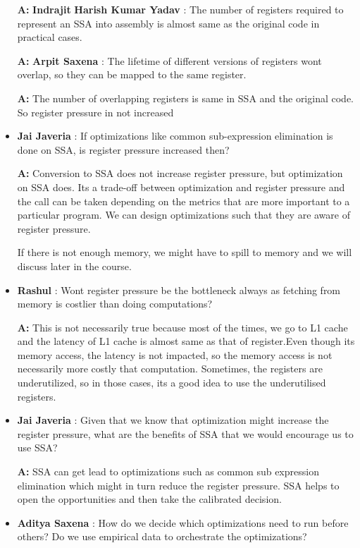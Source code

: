 \begin{itemize}
    \textbf{A:}  \textbf{Indrajit} \textbf{Harish Kumar Yadav} : The number of registers required to represent an SSA into assembly is almost same as the original code in practical cases.  
    
    \textbf{A:} \textbf{Arpit Saxena} : The lifetime of different versions of registers wont overlap, so they can be mapped to the same register.
    
    \textbf{A:} The number of overlapping registers is same in SSA and the original code. So register pressure in not increased
    
    \item \textbf{Jai Javeria} : If optimizations like common sub-expression elimination is done on SSA, is register pressure increased then?
    
    \textbf{A:} Conversion to SSA does not increase register pressure, but optimization on SSA does. Its a trade-off between optimization and register pressure and the call can be taken depending on the metrics that are more important to a particular program. We can design optimizations such that they are aware of register pressure.
    
    If there is not enough memory, we might have to spill to memory and we will discuss later in the course.
    
    \item \textbf{Rashul} : Wont register pressure be the bottleneck always as fetching from memory is costlier than doing computations?
    
    \textbf{A:} This is not necessarily true because most of the times, we go to L1 cache and the latency of L1 cache is almost same as that of register.Even though its memory access, the latency is not impacted, so the memory access is not necessarily more costly that computation.
    Sometimes, the registers are underutilized, so in those cases, its a good idea to use the underutilised registers.
    
    \item \textbf{ Jai Javeria} : Given that we know that optimization might increase the register pressure, what are the benefits of SSA that we would encourage us to use SSA?
    
    \textbf{A:} SSA can get lead to optimizations such as common sub expression elimination which might in turn reduce the register pressure. SSA helps to open the opportunities and then take the calibrated decision.
    
    \item \textbf{Aditya Saxena} : How do we decide which optimizations need to run before others? Do we use empirical data to orchestrate the optimizations?
    

\end{itemize}
